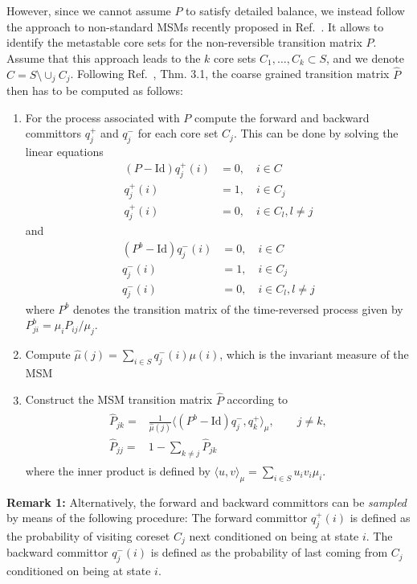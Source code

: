 \documentclass[aps, pre, preprint,unsortedaddress,a4paper,onecolumn]{revtex4}
\newcommand{\vect}[1]{#1}
\newcommand{\fwd}[0]{+}
\newcommand{\bwd}[0]{-}
\newcommand{\id}{\mathrm{Id}}
\begin{document}
However, since we cannot assume $P$ to satisfy detailed balance, we
instead follow the approach to non-standard MSMs recently proposed in Ref.~\cite{sarich2014utilizing}.
It allows to identify the metastable core sets for the
non-reversible transition matrix $P$. Assume that this approach leads
to the $k$ core sets $C_1,\ldots, C_k\subset S$, and we denote $C=S\setminus\cup_j C_j$. Following
Ref.~\cite{djurdjevac2010markov}, Thm. 3.1, the coarse grained transition
matrix $\hat{P}$ then has to be computed as follows:
\begin{enumerate}
\item For the process associated with $P$ compute the forward and backward committors $q^\fwd_j$ and $q^\bwd_j$  for each core set $C_j$. This can be done by solving the linear equations
\begin{align}
(P-\id) q^\fwd_j(i) & =  0, \quad i\in C\label{qfwd}\\
q^\fwd_j(i) & =  1,\quad i\in C_j\nonumber\\
q^\fwd_j(i) & =  0,\quad i\in C_l,l\not=j\nonumber
\end{align}
and
\begin{align}
(P^b-\id) q^\bwd_j(i) & =  0, \quad i\in C\label{qbwd}\\
q^\bwd_j(i) & =  1,\quad i\in C_j\nonumber \\
q^\bwd_j(i) & =  0,\quad i\in C_l,l\not=j\nonumber
\end{align}
where $P^b$ denotes the transition matrix of the time-reversed process
given by $P^b_{ji}=\mu_i P_{ij}/\mu_j$.
\item Compute $\hat{\mu}(j)=\sum_{i\in S} q^\bwd_j(i)\mu(i)$,
  which is the invariant measure of the MSM
\item Construct the MSM transition matrix $\hat{P}$ according to
  \begin{align}
    \label{eq:msm-tmatrix-00}
    \begin{split}      
    \hat{\vect P}_{jk}
    = &
    \frac{1}{\hat{\mu}(j)}
    \langle (\vect P^b - \id) q^\bwd_j,q^\fwd_k \rangle_\mu,\qquad j\not= k, \\    %
    \hat{\vect P}_{jj}
    =&
    1-\sum_{k\not=j} \hat{\vect P}_{jk}
    \end{split}
  \end{align}
where the inner product is defined by
$\langle u,v \rangle_\mu=\sum_{i\in S} u_i v_i \mu_i$.
\end{enumerate}

\noindent\textbf{Remark 1:}
Alternatively, the forward and
backward committors can be \emph{sampled} by means of the following procedure: The forward
committor $q^\fwd_j(i)$ is defined as the probability of visiting coreset
$C_j$ next conditioned on being at state $i$.  The
backward committor $q^\bwd_j(i)$  is defined as the probability
of last coming from $C_j$ conditioned on being at state $i$.
\end{document}
